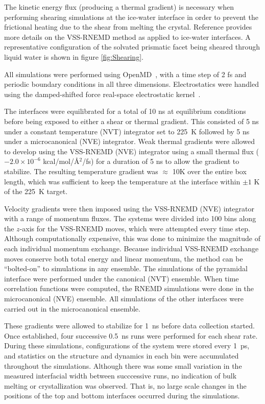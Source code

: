 The kinetic energy flux (producing a thermal gradient) is necessary
when performing shearing simulations at the ice-water interface in
order to prevent the frictional heating due to the shear from melting
the crystal. Reference \citealp{Louden13} provides more details on the
VSS-RNEMD method as applied to ice-water interfaces. A representative
configuration of the solvated prismatic facet being sheared through
liquid water is shown in figure \ref{fig:Shearing}.

All simulations were performed using OpenMD~\cite{OOPSE,openmd}, with
a time step of 2 fs and periodic boundary conditions in all three
dimensions.  Electrostatics were handled using the damped-shifted
force real-space electrostatic kernel~\cite{Ewald}. 

The interfaces were equilibrated for a total of 10 ns at equilibrium
conditions before being exposed to either a shear or thermal gradient.
This consisted of 5 ns under a constant temperature (NVT) integrator
set to 225~K followed by 5 ns under a microcanonical (NVE) integrator.
Weak thermal gradients were allowed to develop using the VSS-RNEMD
(NVE) integrator using a small thermal flux ($-2.0\times 10^{-6}$
kcal/mol/\AA$^2$/fs) for a duration of 5 ns to allow the gradient to
stabilize.  The resulting temperature gradient was $\approx$ 10K over
the entire box length, which was sufficient to keep the temperature at
the interface within $\pm 1$ K of the 225~K target.

Velocity gradients were then imposed using the VSS-RNEMD (NVE)
integrator with a range of momentum fluxes.  The systems were divided
into 100 bins along the $z$-axis for the VSS-RNEMD moves, which were
attempted every time step.  Although computationally expensive, this
was done to minimize the magnitude of each individual momentum
exchange.  Because individual VSS-RNEMD exchange moves conserve both
total energy and linear momentum, the method can be ``bolted-on'' to
simulations in any ensemble.  The simulations of the pyramidal
interface were performed under the canonical (NVT) ensemble.  When
time correlation functions were computed, the RNEMD simulations were
done in the microcanonical (NVE) ensemble.  All simulations of the
other interfaces were carried out in the microcanonical ensemble.

These gradients were allowed to stabilize for 1~ns before data
collection started. Once established, four successive 0.5~ns runs were
performed for each shear rate.  During these simulations,
configurations of the system were stored every 1~ps, and statistics on
the structure and dynamics in each bin were accumulated throughout the
simulations.  Although there was some small variation in the measured
interfacial width between succcessive runs, no indication of bulk
melting or crystallization was observed.  That is, no large scale
changes in the positions of the top and bottom interfaces occurred
during the simulations.

